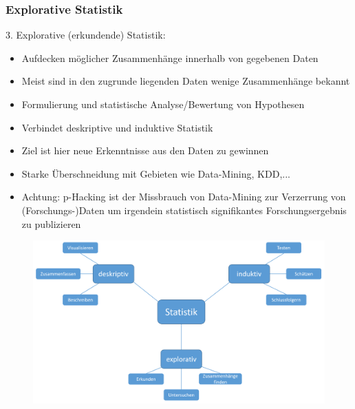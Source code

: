 \begin{frame}
\frametitle{Explorative Statistik}
3. Explorative (erkundende) Statistik:
\begin{itemize}[<+->]
\item Aufdecken möglicher Zusammenhänge innerhalb von gegebenen Daten
\item Meist sind in den zugrunde liegenden Daten wenige Zusammenhänge bekannt
\item Formulierung und statistische Analyse/Bewertung von Hypothesen
\item Verbindet deskriptive und induktive Statistik
\item Ziel ist hier neue Erkenntnisse aus den Daten zu gewinnen
\item Starke Überschneidung mit Gebieten wie Data-Mining, KDD,...
\item Achtung: p-Hacking ist der Missbrauch von Data-Mining zur Verzerrung von (Forschungs-)Daten um irgendein statistisch signifikantes Forschungsergebnis zu publizieren
\end{itemize}
\end{frame}
\begin{frame}
\begin{figure}[hbtp]
\centering
\includegraphics[scale=0.48]{images/statistik.PNG}
\end{figure}
\end{frame}

